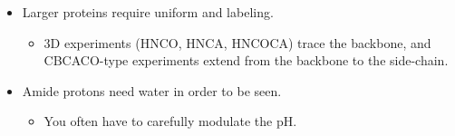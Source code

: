 \documentclass[../notes.tex]{subfiles}
\begin{document}
\begin{itemize}
    \item Larger proteins require uniform  and  labeling.
    \begin{itemize}
        \item 3D experiments (HNCO, HNCA, HNCOCA) trace the backbone, and CBCACO-type experiments extend from the backbone to the side-chain.
    \end{itemize}
    \item Amide protons need water in order to be seen.
    \begin{itemize}
        \item You often have to carefully modulate the pH.
    \end{itemize}
\end{itemize}
\end{document}

